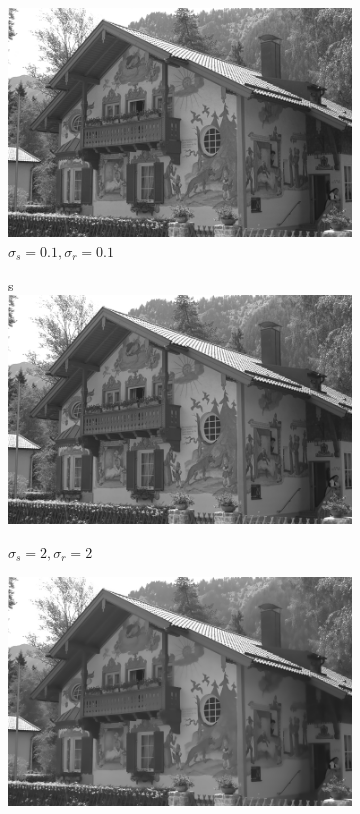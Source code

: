 \documentclass[a4paper, landscape]{article}
\begin{document}
\begin{figure}
    \centering
    \begin{subfigure}{0.33\linewidth}
        \centering
        \includegraphics[width=\linewidth]{kodak24,σ_spatial0.1,σ_range0.1.png}
        \caption{$\sigma_s=0.1, \sigma_r=0.1$}
    \end{subfigure}
    \begin{subfigure}{0.33\linewidth}s
        \centering
        \includegraphics[width=\linewidth]{kodak24,σ_spatial2,σ_range2.png}
        \caption{$\sigma_s=2, \sigma_r=2$}
    \end{subfigure}
    \begin{subfigure}{0.33\linewidth}
        \centering
        \includegraphics[width=\linewidth]{kodak24,σ_spatial3,σ_range15.png}

\end{subfigure}
\end{figure}
\end{document}

